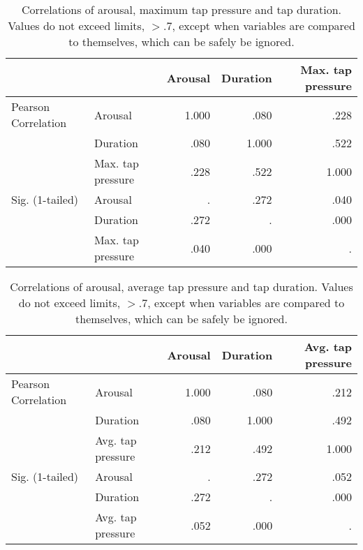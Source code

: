 \par\bigskip

\begin{table}[ht]
\centering
\begin{tabular}{@{}llrrr@{}}
                    &                   & Arousal & Duration & Max. tap pressure \\ \midrule
Pearson Correlation & Arousal           & 1.000   & .080     & .228              \\
                    & Duration          & .080    & 1.000    & .522              \\
                    & Max. tap pressure & .228    & .522     & 1.000             \\ \midrule
Sig. (1-tailed)     & Arousal           & .       & .272     & .040              \\
                    & Duration          & .272    & .        & .000              \\
                    & Max. tap pressure & .040    & .000     & .                
\end{tabular}
\caption{Correlations of arousal, maximum tap pressure and tap duration. Values do not exceed limits, $> .7$, except when variables are compared to themselves, which can be safely be ignored.}
\label{tab:correlations_armax}
\end{table}

\par\bigskip

\begin{table}[!htbp]
\centering
\begin{tabular}{@{}llrrr@{}}
                    &                   & Arousal & Duration & Avg. tap pressure \\ \midrule
Pearson Correlation & Arousal           & 1.000   & .080     & .212              \\
                    & Duration          & .080    & 1.000    & .492              \\
                    & Avg. tap pressure & .212    & .492     & 1.000             \\ \midrule
Sig. (1-tailed)     & Arousal           & .       & .272     & .052              \\
                    & Duration          & .272    & .        & .000              \\
                    & Avg. tap pressure & .052    & .000     & .                
\end{tabular}
\caption{Correlations of arousal, average tap pressure and tap duration. Values do not exceed limits, $> .7$, except when variables are compared to themselves, which can be safely be ignored.}
\label{tab:correlations_aravg}
\end{table}